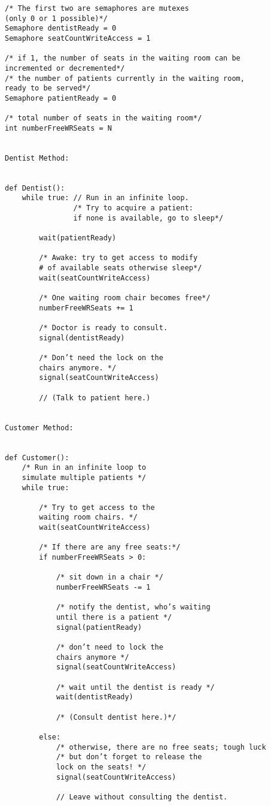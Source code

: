 \documentclass{article}
\begin{document}
\begin{verbatim}
/* The first two are semaphores are mutexes
(only 0 or 1 possible)*/
Semaphore dentistReady = 0
Semaphore seatCountWriteAccess = 1

/* if 1, the number of seats in the waiting room can be
incremented or decremented*/
/* the number of patients currently in the waiting room,
ready to be served*/
Semaphore patientReady = 0

/* total number of seats in the waiting room*/
int numberFreeWRSeats = N


Dentist Method:


def Dentist():
    while true: // Run in an infinite loop.
                /* Try to acquire a patient:
                if none is available, go to sleep*/
        
        wait(patientReady)
        
        /* Awake: try to get access to modify
        # of available seats otherwise sleep*/
        wait(seatCountWriteAccess)
        
        /* One waiting room chair becomes free*/
        numberFreeWRSeats += 1
        
        /* Doctor is ready to consult.
        signal(dentistReady)

        /* Don’t need the lock on the
        chairs anymore. */
        signal(seatCountWriteAccess)

        // (Talk to patient here.)


Customer Method:


def Customer():
    /* Run in an infinite loop to
    simulate multiple patients */
    while true:

        /* Try to get access to the
        waiting room chairs. */
        wait(seatCountWriteAccess)

        /* If there are any free seats:*/
        if numberFreeWRSeats > 0:
        
            /* sit down in a chair */
            numberFreeWRSeats -= 1
        
            /* notify the dentist, who’s waiting
            until there is a patient */
            signal(patientReady)

            /* don’t need to lock the
            chairs anymore */
            signal(seatCountWriteAccess)

            /* wait until the dentist is ready */
            wait(dentistReady)

            /* (Consult dentist here.)*/
        
        else:
            /* otherwise, there are no free seats; tough luck
            /* but don’t forget to release the
            lock on the seats! */
            signal(seatCountWriteAccess)
            
            // Leave without consulting the dentist.
\end{verbatim}
\end{document}
